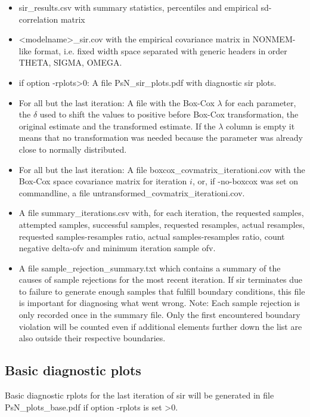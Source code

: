 \begin{itemize}
\item sir\_results.csv with summary statistics, percentiles and empirical sd-correlation matrix
\item <modelname>\_sir.cov with the empirical covariance matrix in NONMEM-like format, i.e. 
      fixed width space separated with generic headers in order THETA, SIGMA, OMEGA.
\item if option -rplots>0: A file PsN\_sir\_plots.pdf with diagnostic sir plots.
\item For all but the last iteration: A file with the Box-Cox $\lambda$ for each parameter, the $\delta$ used to shift
the values to positive before Box-Cox transformation, the original estimate and the transformed estimate. 
If the $\lambda$ column is empty it means that no transformation was
needed because the parameter was already close to normally distributed.
\item For all but the last iteration: A file boxcox\_covmatrix\_iterationi.cov with 
the Box-Cox space covariance matrix for iteration $i$,
or, if -no-boxcox was set on commandline, a file untransformed\_covmatrix\_iterationi.cov.
\item A file summary\_iterations.csv with, for each iteration, 
the requested samples, attempted samples, successful samples, requested resamples,
actual resamples, requested samples-resamples ratio, actual samples-resamples ratio, count negative delta-ofv and minimum iteration sample ofv.
\item A file sample\_rejection\_summary.txt which contains a summary of the causes of sample rejections
for the most recent iteration.
If sir terminates due to failure to generate enough samples that fulfill boundary conditions, this file
is important for diagnosing what went wrong.
Note: Each sample rejection is only recorded once in the summary file.
Only the first encountered boundary violation will be counted even if additional
elements further down the list are also outside their respective boundaries.
\end{itemize}

\subsection{Basic diagnostic plots}
Basic diagnostic rplots for the last iteration of sir will be generated 
in file  PsN\_plots\_base.pdf 
if option -rplots is set >0.

